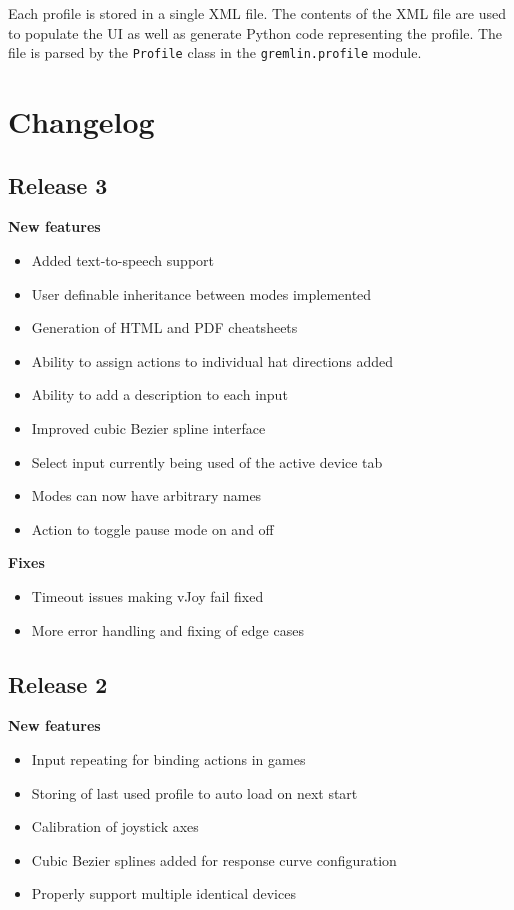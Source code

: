 \documentclass[a4, 10pt]{article}
\begin{document}
Each profile is stored in a single XML file. The contents of the XML
file are used to populate the UI as well as generate Python code
representing the profile. The file is parsed by the \verb+Profile+ class
in the \verb+gremlin.profile+ module.



\section{Changelog}

\subsection{Release 3}

\textbf{New features}
\begin{itemize}
    \item Added text-to-speech support
    \item User definable inheritance between modes implemented
    \item Generation of HTML and PDF cheatsheets
    \item Ability to assign actions to individual hat directions added
    \item Ability to add a description to each input
    \item Improved cubic Bezier spline interface
    \item Select input currently being used of the active device tab
    \item Modes can now have arbitrary names
    \item Action to toggle pause mode on and off
\end{itemize}

\textbf{Fixes}
\begin{itemize}
    \item Timeout issues making vJoy fail fixed
    \item More error handling and fixing of edge cases
\end{itemize}


\subsection{Release 2}

\textbf{New features}
\begin{itemize}
    \item Input repeating for binding actions in games
    \item Storing of last used profile to auto load on next start
    \item Calibration of joystick axes
    \item Cubic Bezier splines added for response curve configuration
    \item Properly support multiple identical devices
\end{itemize}
\end{document}
